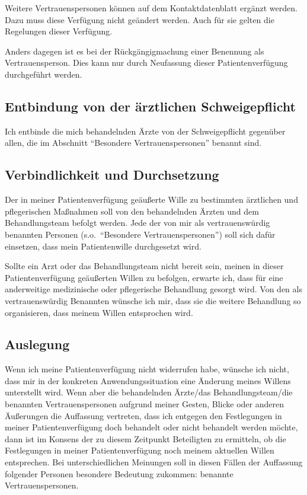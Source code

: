 \documentclass[pdftex,12pt,a4paper]{article}
\begin{document}
Weitere Vertrauenspersonen können auf dem Kontaktdatenblatt
ergänzt werden. Dazu muss diese Verfügung nicht
geändert werden. Auch für sie gelten die Regelungen dieser
Verfügung. 

Anders dagegen ist es bei der Rückgängigmachung einer
Benennung als Vertrauensperson. Dies kann nur durch
Neufassung dieser Patientenverfügung durchgeführt werden.


\subsection{Entbindung von der ärztlichen Schweigepflicht}

Ich entbinde die mich behandelnden Ärzte von der Schweigepflicht 
gegenüber allen, die im Abschnitt \enquote{Besondere Vertrauenspersonen} benannt sind.


\subsection{Verbindlichkeit und Durchsetzung}

Der in meiner Patientenverfügung geäußerte Wille zu bestimmten ärztlichen und pflegerischen Maßnahmen soll von den behandelnden Ärzten und dem Behandlungsteam befolgt werden. Jede der von mir
als vertrauenswürdig benannten Personen (s.o.\ \enquote{Besondere Vertrauenspersonen}) soll sich dafür
einsetzen, dass mein Patientenwille durchgesetzt wird.

Sollte ein Arzt oder das Behandlungsteam nicht bereit sein, meinen in dieser Patientenverfügung geäußerten Willen zu befolgen, erwarte ich, dass für eine anderweitige medizinische oder pflegerische Behandlung gesorgt wird. Von den als vertrauenswürdig Benannten wünsche ich mir, dass sie die weitere Behandlung so organisieren, dass meinem Willen entsprochen wird.

\subsection{Auslegung}

Wenn ich meine Patientenverfügung nicht widerrufen habe, wünsche ich nicht, dass mir in der konkreten Anwendungssituation eine Änderung meines Willens unterstellt wird. Wenn aber die behandelnden Ärzte/das Behandlungsteam/die benannten Vertrauenspersonen aufgrund meiner Gesten, Blicke oder anderen Äußerungen die Auffassung vertreten, dass ich entgegen den Festlegungen in meiner Patientenverfügung doch behandelt oder nicht behandelt werden möchte, dann ist im Konsens der zu diesem Zeitpunkt Beteiligten zu ermitteln, ob die Festlegungen in meiner Patientenverfügung noch meinem aktuellen Willen entsprechen. Bei unterschiedlichen Meinungen soll in diesen Fällen der Auffassung folgender Personen besondere Bedeutung zukommen: benannte Vertrauenspersonen.
\end{document}
